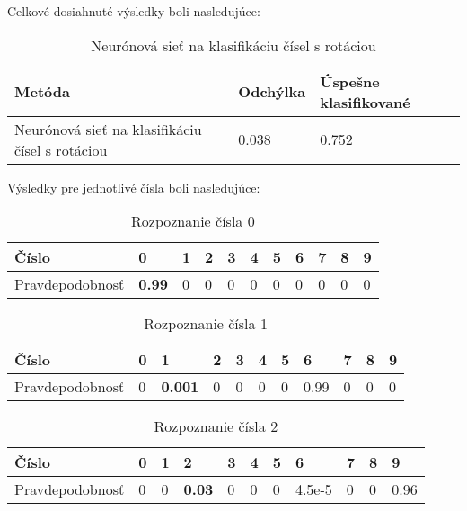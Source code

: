 Celkové dosiahnuté výsledky boli nasledujúce:

\begin{table}[H]
  \begin{tabular}{ | l | l | l |}
    \hline
    Metóda & Odchýlka & Úspešne klasifikované \\ \hline
    Neurónová sieť na klasifikáciu čísel s rotáciou & 0.038 & 0.752 \\
    \hline
  \end{tabular}
  \caption[Neurónová sieť na klasifikáciu čísel s rotáciou]{Neurónová sieť na klasifikáciu čísel s rotáciou}
\end{table}

\newpage
Výsledky pre jednotlivé čísla boli nasledujúce:

\begin{table}[H]
  \begin{tabular}{ | l | l | l | l | l | l | l | l | l | l | l |}
    \hline
    Číslo & 0 & 1 & 2 & 3 & 4 & 5 & 6 & 7 & 8 & 9 \\ \hline
    Pravdepodobnosť & \textbf{0.99} & 0 & 0 & 0 & 0 & 0 & 0 & 0 & 0 & 0 \\
    \hline
  \end{tabular}
  \caption[Rozpoznanie čísla 0]{Rozpoznanie čísla 0}
\end{table}

\begin{table}[H]
  \begin{tabular}{ | l | l | l | l | l | l | l | l | l | l | l |}
    \hline
    Číslo & 0 & 1 & 2 & 3 & 4 & 5 & 6 & 7 & 8 & 9 \\ \hline
    Pravdepodobnosť & 0 & \textbf{0.001} & 0 & 0 & 0 & 0 & 0.99 & 0 & 0 & 0 \\
    \hline
  \end{tabular}
  \caption[Rozpoznanie čísla 1]{Rozpoznanie čísla 1}
\end{table}

\begin{table}[H]
  \begin{tabular}{ | l | l | l | l | l | l | l | l | l | l | l |}
    \hline
    Číslo & 0 & 1 & 2 & 3 & 4 & 5 & 6 & 7 & 8 & 9 \\ \hline
    Pravdepodobnosť & 0 & 0 & \textbf{0.03} & 0 & 0 & 0 & 4.5e-5 & 0 & 0 & 0.96 \\
    \hline
  \end{tabular}
  \caption[Rozpoznanie čísla 2]{Rozpoznanie čísla 2}
\end{table}

